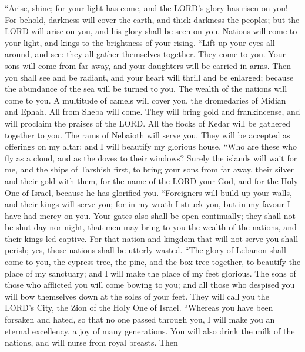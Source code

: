  ``Arise, shine; for your light has come, and the LORD's
glory has risen on you!  For behold, darkness will cover
the earth, and thick darkness the peoples; but the LORD will arise on
you, and his glory shall be seen on you.  Nations will
come to your light, and kings to the brightness of your rising.
 ``Lift up your eyes all around, and see: they all gather
themselves together. They come to you. Your sons will come from far
away, and your daughters will be carried in arms.  Then
you shall see and be radiant, and your heart will thrill and be
enlarged; because the abundance of the sea will be turned to you. The
wealth of the nations will come to you.  A multitude of
camels will cover you, the dromedaries of Midian and Ephah. All from
Sheba will come. They will bring gold and frankincense, and will
proclaim the praises of the LORD.  All the flocks of Kedar
will be gathered together to you. The rams of Nebaioth will serve you.
They will be accepted as offerings on my altar; and I will beautify my
glorious house.  ``Who are these who fly as a cloud, and
as the doves to their windows?  Surely the islands will
wait for me, and the ships of Tarshish first, to bring your sons from
far away, their silver and their gold with them, for the name of the
LORD your God, and for the Holy One of Israel, because he has glorified
you.  ``Foreigners will build up your walls, and their
kings will serve you; for in my wrath I struck you, but in my favour I
have had mercy on you.  Your gates also shall be open
continually; they shall not be shut day nor night, that men may bring to
you the wealth of the nations, and their kings led captive.
 For that nation and kingdom that will not serve you
shall perish; yes, those nations shall be utterly wasted.
 ``The glory of Lebanon shall come to you, the cypress
tree, the pine, and the box tree together, to beautify the place of my
sanctuary; and I will make the place of my feet glorious.
 The sons of those who afflicted you will come bowing to
you; and all those who despised you will bow themselves down at the
soles of your feet. They will call you the LORD's City, the Zion of the
Holy One of Israel.  ``Whereas you have been forsaken and
hated, so that no one passed through you, I will make you an eternal
excellency, a joy of many generations.  You will also
drink the milk of the nations, and will nurse from royal breasts. Then
